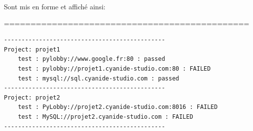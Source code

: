 Sont mis en forme et affiché ainsi:

==============================================

\begin{lstlisting}
----------------------------------------------
Project: projet1
    test : pylobby://www.google.fr:80 : passed
    test : pylobby://projet1.cyanide-studio.com:80 : FAILED
    test : mysql://sql.cyanide-studio.com : passed
----------------------------------------------
Project: projet2
    test : PyLobby://projet2.cyanide-studio.com:8016 : FAILED
    test : MySQL://projet2.cyanide-studio.com : FAILED
----------------------------------------------
\end{lstlisting}

